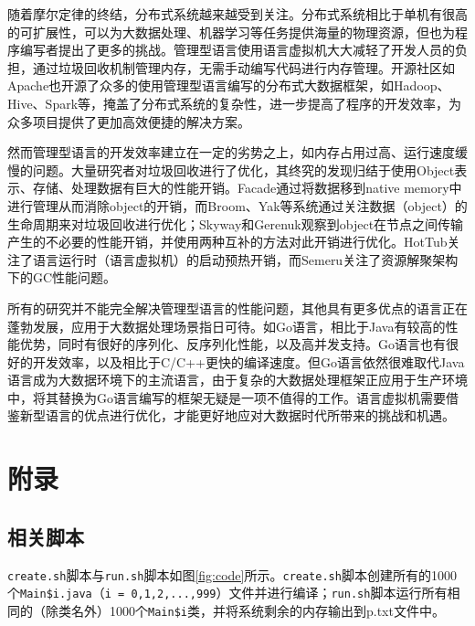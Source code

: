 \documentclass[lang=cn,12pt,a4paper,cite=authoryear]{elegantpaper}
\begin{document}
\begin{figure*}[!htp]
\begin{figure*}[!htp]
随着摩尔定律的终结，分布式系统越来越受到关注。分布式系统相比于单机有很高的可扩展性，可以为大数据处理、机器学习等任务提供海量的物理资源，但也为程序编写者提出了更多的挑战。管理型语言使用语言虚拟机大大减轻了开发人员的负担，通过垃圾回收机制管理内存，无需手动编写代码进行内存管理。开源社区如Apache也开源了众多的使用管理型语言编写的分布式大数据框架，如Hadoop、Hive、Spark等，掩盖了分布式系统的复杂性，进一步提高了程序的开发效率，为众多项目提供了更加高效便捷的解决方案。

然而管理型语言的开发效率建立在一定的劣势之上，如内存占用过高、运行速度缓慢的问题。大量研究者对垃圾回收进行了优化，其终究的发现归结于使用Object表示、存储、处理数据有巨大的性能开销。Facade通过将数据移到native memory中进行管理从而消除object的开销，而Broom、Yak等系统通过关注数据（object）的生命周期来对垃圾回收进行优化；Skyway和Gerenuk观察到object在节点之间传输产生的不必要的性能开销，并使用两种互补的方法对此开销进行优化。HotTub关注了语言运行时（语言虚拟机）的启动预热开销，而Semeru关注了资源解聚架构下的GC性能问题。

所有的研究并不能完全解决管理型语言的性能问题，其他具有更多优点的语言正在蓬勃发展，应用于大数据处理场景指日可待。如Go语言，相比于Java有较高的性能优势，同时有很好的序列化、反序列化性能，以及高并发支持。Go语言也有很好的开发效率，以及相比于C/C++更快的编译速度。但Go语言依然很难取代Java语言成为大数据环境下的主流语言，由于复杂的大数据处理框架正应用于生产环境中，将其替换为Go语言编写的框架无疑是一项不值得的工作。语言虚拟机需要借鉴新型语言的优点进行优化，才能更好地应对大数据时代所带来的挑战和机遇。

\nocite{*}
\cleardoublepage


\cleardoublepage
\appendix
\addappheadtotoc
\section{附录}

\subsection{相关脚本}
\label{code}
\texttt{create.sh}脚本与\texttt{run.sh}脚本如图\ref{fig:code}所示。\texttt{create.sh}脚本创建所有的1000个\texttt{Main\$i.java}（\texttt{i = 0,1,2,...,999}）文件并进行编译；\texttt{run.sh}脚本运行所有相同的（除类名外）1000个\texttt{Main\$i}类，并将系统剩余的内存输出到p.txt文件中。
\end{figure*}
\end{figure*}
\end{document}
